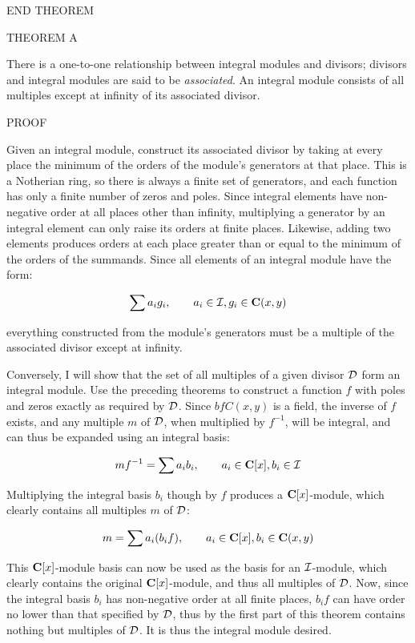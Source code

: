 END THEOREM

THEOREM A

There is a one-to-one relationship between integral modules and
divisors; divisors and integral modules are said to be {\it
associated}.  An integral module consists of all multiples except at
infinity of its associated divisor.

PROOF

Given an integral module, construct its associated divisor by taking
at every place the minimum of the orders of the module's generators at
that place.  This is a Notherian ring, so there is always a finite set
of generators, and each function has only a finite number of zeros and
poles.  Since integral elements have non-negative order at all places
other than infinity, multiplying a generator by an integral element
can only raise its orders at finite places.  Likewise, adding two
elements produces orders at each place greater than or equal to the
minimum of the orders of the summands.  Since all elements of an
integral module have the form:

	$$\sum a_i g_i, \qquad a_i \in {\cal I}, g_i \in {\bf C}(x,y)$$

everything constructed from the module's generators must be a
multiple of the associated divisor except at infinity.

Conversely, I will show that the set of all multiples of a given
divisor $\cal D$ form an integral module.  Use the preceding theorems
to construct a function $f$ with poles and zeros exactly as required
by $\cal D$.  Since ${bf C}(x,y)$ is a field, the inverse of $f$ exists,
and any multiple $m$ of $\cal D$, when multiplied by $f^{-1}$, will be
integral, and can thus be expanded using an integral basis:

	$$mf^{-1} = \sum a_i b_i, \qquad a_i \in {\bf C}[x], b_i \in {\cal I}$$

Multiplying the integral basis $b_i$ though by $f$ produces a ${\bf
C}[x]$-module, which clearly contains all multiples $m$ of $\cal D$:

	$$m = \sum a_i (b_i f), \qquad a_i \in {\bf C}[x], b_i \in {\bf C}(x,y)$$

This ${\bf C}[x]$-module basis can now be used as the basis for an
${\cal I}$-module, which clearly contains the original ${\bf
C}[x]$-module, and thus all multiples of ${\cal D}$.  Now, since the
integral basis $b_i$ has non-negative order at all finite places, $b_i
f$ can have order no lower than that specified by ${\cal D}$, thus by
the first part of this theorem contains nothing but multiples of
${\cal D}$.  It is thus the integral module desired.

